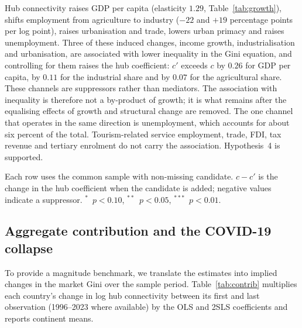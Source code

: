 \documentclass[12pt]{article}
\newcommand{\sym}[1]{\ensuremath{^{#1}}}
\begin{document}
Hub connectivity raises GDP per capita (elasticity $1.29$, Table~\ref{tab:growth}), shifts employment from agriculture to industry ($-22$ and $+19$ percentage points per log point), raises urbanisation and trade, lowers urban primacy and raises unemployment. Three of these induced changes, income growth, industrialisation and urbanisation, are associated with lower inequality in the Gini equation, and controlling for them raises the hub coefficient: $c'$ exceeds $c$ by $0.26$ for GDP per capita, by $0.11$ for the industrial share and by $0.07$ for the agricultural share. These channels are suppressors rather than mediators. The association with inequality is therefore not a by-product of growth; it is what remains after the equalising effects of growth and structural change are removed. The one channel that operates in the same direction is unemployment, which accounts for about six percent of the total. Tourism-related service employment, trade, FDI, tax revenue and tertiary enrolment do not carry the association. Hypothesis~4 is supported.

\begin{table}[H]\centering\caption{Mechanisms: induced changes and the residual association with the market Gini (2SLS, Feyrer instrument, robust SE).}\label{tab:mech}
\begin{threeparttable}\small
\begin{tablenotes}\footnotesize\item Each row uses the common sample with non-missing candidate. $c-c'$ is the change in the hub coefficient when the candidate is added; negative values indicate a suppressor. \sym{*}~$p<0.10$, \sym{**}~$p<0.05$, \sym{***}~$p<0.01$.\end{tablenotes}\end{threeparttable}\end{table}

\subsection{Aggregate contribution and the COVID-19 collapse}
\label{sec:contrib}
To provide a magnitude benchmark, we translate the estimates into implied changes in the market Gini over the sample period. Table~\ref{tab:contrib} multiplies each country's change in log hub connectivity between its first and last observation (1996--2023 where available) by the OLS and 2SLS coefficients and reports continent means.
\end{document}
